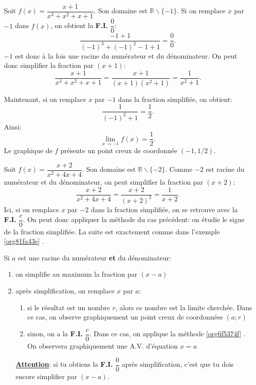 \documentclass[a4paper,12pt]{report}
\newcommand{\IR}{\mathbb{R}}
\newcommand{\FI}{\textbf{F.I.}}
\begin{document}
\begin{enumerate}
\begin{exemple}
Soit \(f(x)=\dfrac{x+1}{x^3+x^2+x+1}\). Son domaine est
\(\IR\backslash\{-1\}\). Si on remplace \(x\) par \(-1\) dans \(f(x)\), on
obtient la \FI{} \(\dfrac{0}{0}\):
\[
\dfrac{-1+1}{(-1)^3+(-1)^2-1+1}=\dfrac{0}{0}.
\]
\(-1\) est donc à la fois une racine du numérateur et du
dénominateur. On peut donc simplifier la fraction par \((x+1)\):
\[
\dfrac{x+1}{x^3+x^2+x+1}=\dfrac{x+1}{(x+1)(x^2+1)}=\dfrac{1}{x^2+1}.
\]

Maintenant, si on remplace \(x\) par \(-1\) dans la fraction simplifiée,
on obtient:
\[
\dfrac{1}{(-1)^2+1}=\dfrac{1}{2}.
\]
Ainsi:
\[
\lim\limits_{x\to -1}f(x)=\dfrac{1}{2}.
\]
Le graphique de \(f\) présente un point creux de coordonnée \((-1,1/2)\).
\end{exemple}

\begin{exemple}
Soit \(f(x)=\dfrac{x+2}{x^2+4x+4}\). Son domaine est
\(\IR\backslash\{-2\}\). Comme \(-2\) est racine du numérateur et du
dénominateur, on peut simplifier la fraction par \((x+2)\):
\[
\dfrac{x+2}{x^2+4x+4}=\dfrac{x+2}{(x+2)^2}=\dfrac{1}{x+2}.
\]
Ici, si on remplace \(x\) par \(-2\) dans la fraction simplifiée, on se
retrouve avec la \FI{} \(\dfrac{c}{0}\). On peut donc appliquer la
méthode du cas précédent: on étudie le signe de la fraction
simplifiée. La suite est exactement comme dans l'exemple
\ref{org81fa43e} .
\end{exemple}

\begin{methode}
Si \(a\) est une racine du numérateur \textbf{et} du dénominateur:

\begin{enumerate}
\item on simplifie au maximum la fraction par \((x-a)\)
\item après simplification, on remplace \(x\) par \(a\):
\begin{enumerate}
\item si le résultat est un nombre \(r\), alors ce nombre est la limite
cherchée. Dans ce cas, on observe graphiquement un point creux de
  coordonnées \((a;r)\)
\item sinon, on a la \FI{} \(\dfrac{c}{0}\). Dans ce cas, on applique la
méthode \ref{org6f5374f} . On observera graphiquement
  une A.V. d'équation \(x=a\)
\end{enumerate}

 \textbf{\uline{Attention}}: si tu obtiens la \FI{} \(\dfrac{0}{0}\) après
simplification, c'est que tu dois encore simplifier par \((x-a)\).
\end{enumerate}
\end{methode}
\end{enumerate}
\end{document}
